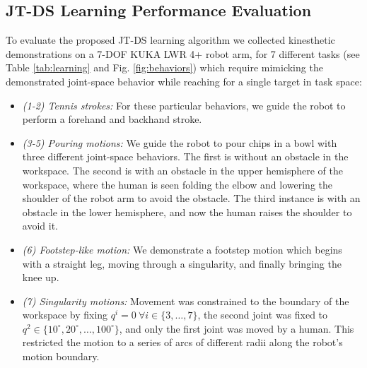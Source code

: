 \documentclass[letterpaper, 10 pt, conference,fleqn]{ieeeconf}
\begin{document}
\subsection{JT-DS Learning Performance  Evaluation}
To evaluate the proposed JT-DS learning algorithm we collected kinesthetic demonstrations on a 7-DOF KUKA LWR 4+ robot arm, for 7 different tasks (see Table \ref{tab:learning} and Fig. \ref{fig:behaviors}) which require mimicking the demonstrated joint-space behavior while reaching for a single target in task space:
\begin{itemize}[leftmargin=*]
\item \textit{(1-2) Tennis strokes:} For these particular behaviors, we guide the robot to perform a forehand and backhand stroke.  
\item \textit{(3-5) Pouring motions:} We guide the robot to pour chips in a bowl with three different joint-space behaviors. The first is without an obstacle in the workspace. The second is with an obstacle in the upper hemisphere of the workspace, where the human is seen folding the elbow and lowering the shoulder of the robot arm to avoid the obstacle. The third instance is with an obstacle in the lower hemisphere, and now the human raises the shoulder to avoid it.
\item \textit{(6) Footstep-like motion:} We demonstrate a footstep motion which begins with a straight leg, moving through a singularity, and finally bringing the knee up.
\item \textit{(7) Singularity motions:} Movement was constrained to the boundary of the workspace by fixing $ q^i=0~\forall i\in\{3,\dots,7\}$, the second joint was fixed to $q^2\in\{10^\circ,20^\circ,\dots,100^\circ\}$, and only the first joint was moved by a human. This restricted the motion to a series of arcs of different radii along the robot's motion boundary.  
\end{itemize}

\end{document}
